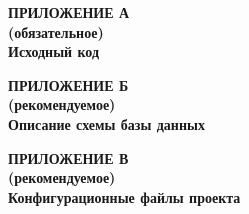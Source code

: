 \begin{center}
  \textbf{
  \MakeUppercase{Приложение А}\\
  (обязательное)\\
  Исходный код}
  \end{center}
  
  
  
  
  
  
  
  \newpage
  
  \begin{center}
  \textbf{
  \MakeUppercase{Приложение Б}\\
  (рекомендуемое)\\
  Описание схемы базы данных}
  \end{center}
  
  
  
  \newpage
  
  \begin{center}
  \textbf{
  \MakeUppercase{Приложение В}\\
  (рекомендуемое)\\
  Конфигурационные файлы проекта}
  \end{center}
  
  
  \newpage
  